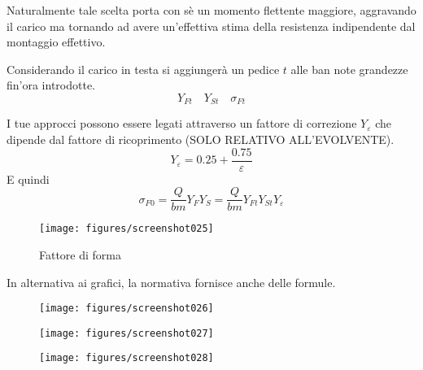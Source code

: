 \documentclass[a4paper, 15pt]{article}
\begin{document}
\begin{adjustwidth}{2in}{}
	Naturalmente tale scelta porta con sè un momento flettente maggiore, aggravando il carico ma tornando ad avere un'effettiva stima della resistenza indipendente dal montaggio effettivo. 
	
	Considerando il carico in testa si aggiungerà un pedice $t$ alle ban note grandezze fin'ora introdotte. 
	\[Y_{Ft} \quad Y_{St} \quad \sigma_{Ft}\]
	
	I tue approcci possono essere legati attraverso un fattore di correzione $Y_\varepsilon$ che dipende dal fattore di ricoprimento (SOLO RELATIVO ALL'EVOLVENTE). 
	\[Y_\varepsilon = 0.25 + \dfrac{0.75}{\varepsilon}\]
	E quindi
	\[\sigma_{F0} = \dfrac{Q}{bm}Y_FY_S = \dfrac{Q}{bm}Y_{Ft}Y_{St}Y_\varepsilon\]	
	\begin{figure}[H]
		\centering
		\texttt{[image: figures/screenshot025]}
		\caption{Fattore di forma}
		\label{fig:screenshot025}
	\end{figure}
In alternativa ai grafici, la normativa fornisce anche delle formule. 	
	 \begin{figure}[H]
	 	\centering
	 	\texttt{[image: figures/screenshot026]}
	 	\label{fig:screenshot026}
	 \end{figure}
	 \begin{figure}[H]
	 	\centering
	 	\texttt{[image: figures/screenshot027]}
	 	\label{fig:screenshot027}
	 \end{figure}
	 \begin{figure}[H]
	 	\centering
	 	\texttt{[image: figures/screenshot028]}
	 	\label{fig:screenshot028}
	 \end{figure}	 
\end{adjustwidth}
\newpage
\end{document}
